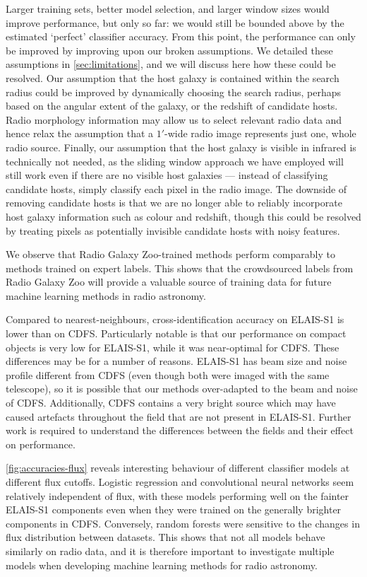 \documentclass[fleqn,usenatbib,usedcolumn]{mnras}
\begin{document}
  Larger training sets, better model selection, and larger window sizes would
  improve performance, but only so far: we would still be bounded above by the
  estimated `perfect' classifier accuracy. From this point, the performance
  can only be improved by improving upon our broken assumptions. We detailed
  these assumptions in \autoref{sec:limitations}, and we will discuss here how
  these could be resolved. Our assumption that the host galaxy is contained
  within the search radius could be improved by dynamically choosing the
  search radius, perhaps based on the angular extent of the galaxy, or the
  redshift of candidate hosts. Radio morphology information may allow us to
  select relevant radio data and hence relax the assumption that a $1'$-wide
  radio image represents just one, whole radio source. Finally, our assumption
  that the host galaxy is visible in infrared is technically not needed, as
  the sliding window approach we have employed will still work even if there
  are no visible host galaxies --- instead of classifying candidate hosts,
  simply classify each pixel in the radio image. The downside of removing
  candidate hosts is that we are no longer able to reliably incorporate host
  galaxy information such as colour and redshift, though this could be
  resolved by treating pixels as potentially invisible candidate hosts with
  noisy features.

  We observe that Radio Galaxy Zoo-trained methods perform comparably to
  methods trained on expert labels. This shows that the crowdsourced labels
  from Radio Galaxy Zoo will provide a valuable source of training
  data for future machine learning methods in radio astronomy.

  Compared to nearest-neighbours, cross-identification accuracy on ELAIS-S1 is
  lower than on CDFS. Particularly notable is that our performance on compact
  objects is very low for ELAIS-S1, while it was near-optimal for CDFS. These
  differences may be for a number of reasons. ELAIS-S1 has beam size and noise
  profile different from CDFS (even though both were imaged with the same
  telescope), so it is possible that our methods over-adapted to the beam and
  noise of CDFS. Additionally, CDFS contains a very bright source which may
  have caused artefacts throughout the field that are not present in ELAIS-S1.
  Further work is required to understand the differences between the fields
  and their effect on performance.

  \autoref{fig:accuracies-flux} reveals interesting behaviour of different
  classifier models at different flux cutoffs. Logistic regression and
  convolutional neural networks seem relatively independent of flux, with
  these models performing well on the fainter ELAIS-S1 components even when
  they were trained on the generally brighter components in CDFS. Conversely,
  random forests were sensitive to the changes in flux distribution between
  datasets. This shows that not all models behave similarly on radio data,
  and it is therefore important to investigate multiple models when
  developing machine learning methods for radio astronomy.
\end{document}
